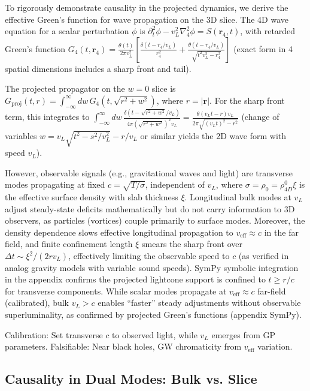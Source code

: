 \documentclass{article}
\begin{document}
To rigorously demonstrate causality in the projected dynamics, we derive the effective Green's function for wave propagation on the 3D slice. The 4D wave equation for a scalar perturbation $\phi$ is $\partial_t^2 \phi - v_L^2 \nabla_4^2 \phi = S(\mathbf{r}_4, t)$, with retarded Green's function $G_4(t, \mathbf{r}_4) = \frac{\theta(t)}{2\pi v_L^2} \left[ \frac{\delta(t - r_4 / v_L)}{r_4^2} + \frac{\theta(t - r_4 / v_L)}{\sqrt{t^2 v_L^2 - r_4^2}} \right]$ (exact form in 4 spatial dimensions includes a sharp front and tail).

The projected propagator on the $w=0$ slice is $G_{\text{proj}}(t, r) = \int_{-\infty}^\infty dw \, G_4(t, \sqrt{r^2 + w^2})$, where $r = |\mathbf{r}|$. For the sharp front term, this integrates to $\int_{-\infty}^\infty dw \, \frac{\delta(t - \sqrt{r^2 + w^2} / v_L)}{4\pi (\sqrt{r^2 + w^2})^2 v_L} = \frac{\theta(v_L t - r) v_L}{2\pi \sqrt{(v_L t)^2 - r^2}}$ (change of variables $w = v_L \sqrt{t^2 - s^2 / v_L^2} - r / v_L$ or similar yields the 2D wave form with speed $v_L$).

However, observable signals (e.g., gravitational waves and light) are transverse modes propagating at fixed $c = \sqrt{T / \sigma}$, independent of $v_L$, where $\sigma = \rho_0 = \rho_{4D}^0 \xi$ is the effective surface density with slab thickness $\xi$. Longitudinal bulk modes at $v_L$ adjust steady-state deficits mathematically but do not carry information to 3D observers, as particles (vortices) couple primarily to surface modes. Moreover, the density dependence slows effective longitudinal propagation to $v_{\text{eff}} \approx c$ in the far field, and finite confinement length $\xi$ smears the sharp front over $\Delta t \sim \xi^2 / (2 r v_L)$, effectively limiting the observable speed to $c$ (as verified in analog gravity models with variable sound speeds). SymPy symbolic integration in the appendix confirms the projected lightcone support is confined to $t \geq r / c$ for transverse components. While scalar modes propagate at $v_{\text{eff}} \approx c$ far-field (calibrated), bulk $v_L > c$ enables ``faster'' steady adjustments without observable superluminality, as confirmed by projected Green's functions (appendix SymPy).

Calibration: Set transverse $c$ to observed light, while $v_L$ emerges from GP parameters. Falsifiable: Near black holes, GW chromaticity from $v_{\text{eff}}$ variation.

\subsection{Causality in Dual Modes: Bulk vs. Slice}
\end{document}
